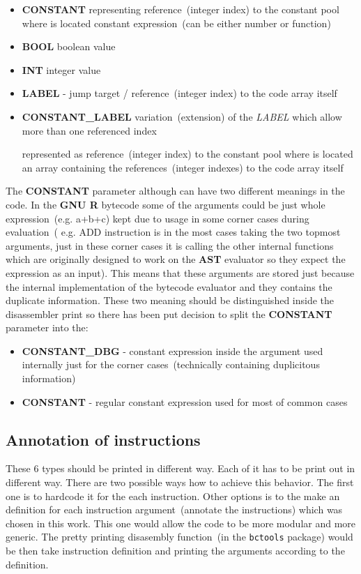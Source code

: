\documentclass[thesis=M,english]{FITthesis}[2018/10/20]
\newcommand{\code}[1]{\texttt{#1}}
\begin{document}
\begin{itemize}
	\item \textbf{CONSTANT} representing reference~(integer index) to the constant pool where is located constant expression~(can be either number or function)

	\item \textbf{BOOL} boolean value

	\item \textbf{INT} integer value

	\item \textbf{LABEL} - jump target / reference~(integer index) to the code array itself

	\item \textbf{CONSTANT{\_}LABEL} variation~(extension) of the \textit{LABEL} which allow more than one referenced index
	
	represented as reference~(integer index) to the constant pool where is located an array containing the references~(integer indexes) to the code array itself
\end{itemize}

The \textbf{CONSTANT} parameter although can have two different meanings in the code. In the \textbf{GNU R} bytecode some of the arguments could be just whole expression~(e.g. a+b+c) kept due to usage in some corner cases during evaluation~( e.g. ADD instruction is in the most cases taking the two topmost arguments, just in these corner cases it is calling the other internal functions which are originally designed to work on the \textbf{AST} evaluator so they expect the expression as an input). This means that these arguments are stored just because the internal implementation of the bytecode evaluator and they contains the duplicate information. These two meaning should be distinguished inside the disassembler print so there has been put decision to split the \textbf{CONSTANT} parameter into the:

\begin{itemize}
	\item \textbf{CONSTANT{\_}DBG} - constant expression inside the argument used internally just for the corner cases~(technically containing duplicitous information)

	\item \textbf{CONSTANT} - regular constant expression used for most of common cases
\end{itemize}

\subsection{Annotation of instructions}\label{annotation-of-instructions}
These 6 types should be printed in different way. Each of it has to be print out in different way. There are two possible ways how to achieve this behavior. The first one is to hardcode it for the each instruction.  Other options is to the make an definition for each instruction argument~(annotate the instructions) which was chosen in this work. This one would allow the code to be more modular and more generic. The pretty printing disasembly function~(in the \code{bctools} package) would be then take instruction definition and printing the arguments according to the definition. 
\end{document}
